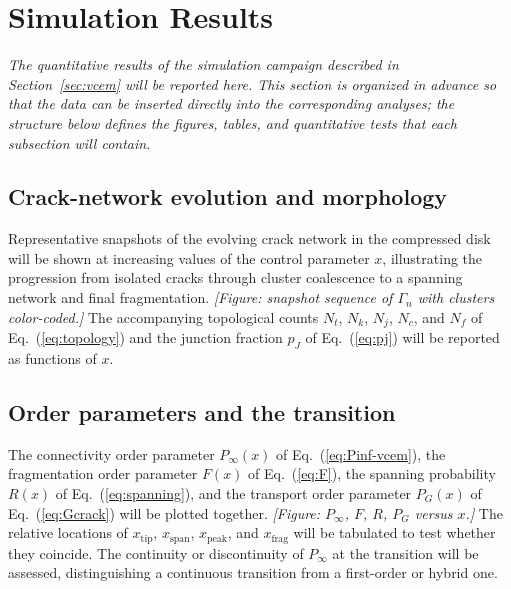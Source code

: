 \documentclass[preprint,12pt]{elsarticle}
\begin{document}
\section{Simulation Results}
\label{sec:results}

\emph{The quantitative results of the simulation campaign described in
Section~\ref{sec:vcem} will be reported here. This section is organized in advance so
that the data can be inserted directly into the corresponding analyses; the structure
below defines the figures, tables, and quantitative tests that each subsection will
contain.}

\subsection{Crack-network evolution and morphology}
\label{sec:res-morphology}

Representative snapshots of the evolving crack network in the compressed disk will be
shown at increasing values of the control parameter $x$, illustrating the progression
from isolated cracks through cluster coalescence to a spanning network and final
fragmentation. \emph{[Figure: snapshot sequence of $\Gamma_n$ with clusters
color-coded.]} The accompanying topological counts $N_t$, $N_k$, $N_j$, $N_c$, and
$N_f$ of Eq.~(\ref{eq:topology}) and the junction fraction $p_J$ of Eq.~(\ref{eq:pj})
will be reported as functions of $x$.

\subsection{Order parameters and the transition}
\label{sec:res-order}

The connectivity order parameter $P_\infty(x)$ of Eq.~(\ref{eq:Pinf-vcem}), the
fragmentation order parameter $F(x)$ of Eq.~(\ref{eq:F}), the spanning probability
$R(x)$ of Eq.~(\ref{eq:spanning}), and the transport order parameter $P_G(x)$ of
Eq.~(\ref{eq:Gcrack}) will be plotted together. \emph{[Figure: $P_\infty$, $F$, $R$,
$P_G$ versus $x$.]} The relative locations of $x_{\mathrm{tip}}$,
$x_{\mathrm{span}}$, $x_{\mathrm{peak}}$, and $x_{\mathrm{frag}}$ will be tabulated to
test whether they coincide. The continuity or discontinuity of $P_\infty$ at the
transition will be assessed, distinguishing a continuous transition from a first-order
or hybrid one.
\end{document}
